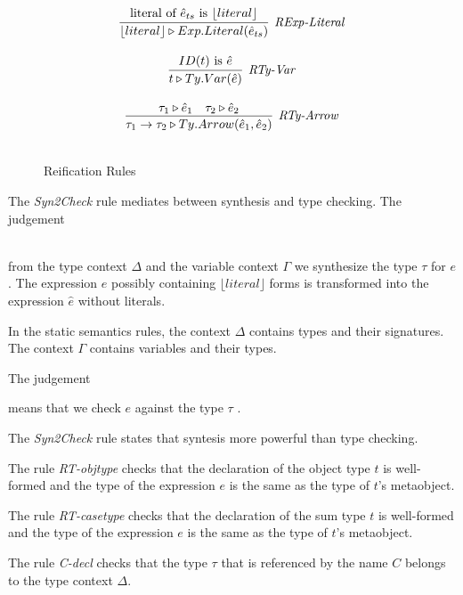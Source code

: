 \begin{figure}
\begin{minipage}{.5\textwidth}
\[\begin{array}{c}
\infer[\textit{RExp-Literal}]
	{ \lfloor literal \rfloor \triangleright Exp.Literal( \hat{e}_{ts} )  }
	{ \text{literal of}\ \hat{e}_{ts}\ \text{is}\ \lfloor literal \rfloor  } \\[3ex]

\infer[\textit{RTy-Var}]
	{ t \triangleright Ty.Var(\hat{e})   }
	{ ID(t)\ \text{is}\ \hat{e}} \\[3ex]

\infer[\textit{RTy-Arrow}]
	{ \tau_1 \rightarrow \tau_2 \triangleright Ty.Arrow(\hat{e}_1,\hat{e}_2 )  }
	{ \tau_1 \triangleright \hat{e}_1 & \tau_2 \triangleright \hat{e}_2 } \\[3ex]
   
\end{array}
\]
\caption{Reification Rules}
\end{minipage}
\end{figure}



The \textit{Syn2Check} rule mediates between synthesis and type checking. 
The judgement 

\\
\noindent
from the type context $\Delta$ and the variable context $\Gamma$ we synthesize the type $\tau$ for $e$. The  expression $e$ possibly containing $\lfloor literal \rfloor$ forms is transformed into the expression $\hat{e}$ without literals.

In the static semantics rules, the context $\Delta$ contains types and their signatures. The context $\Gamma$ contains variables and their types. 

The judgement 


means that we check $e$ against the type $\tau$ . 

The \textit{Syn2Check} rule states that syntesis more powerful than type checking.

The rule \textit{RT-objtype} checks that the declaration of the object type $t$ is well-formed and the type of the expression $e$ is the same as the type of $t$'s metaobject.

The rule \textit{RT-casetype} checks that the declaration of the sum type $t$ is well-formed and the type of the expression $e$ is the same as the type of $t$'s metaobject.

The rule \textit{C-decl} checks that the type $\tau$ that is referenced by the name $C$ belongs to the type context $\Delta$.


